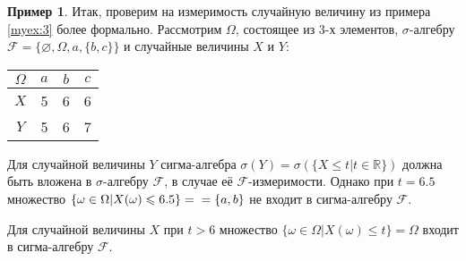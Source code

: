 \documentclass[pdftex, 12pt, a4paper]{article}
\def\R{\ensuremath{\mathbb{R}}} %
\def\F{\ensuremath{\mathcal{F}}} %
\def\s{\ensuremath{\sigma}}
\def \Om{\Omega}
\renewcommand{\le}{\leqslant}
\theoremstyle{definition} %
\newtheorem{myex}{Пример}
\numberwithin{problem}{section}
\numberwithin{blits}{section}
\begin{document}
\begin{myex}
Итак, проверим на измеримость случайную величину из примера \ref{myex:3} более формально. Рассмотрим $\Omega$, состоящее из 3-х элементов, $\sigma$-алгебру $\F=\{\varnothing,\Omega,a,\{b,c\}\}$ и случайные величины $X$ и $Y$:

\begin{table}[H]
\begin{center}
\begin{tabular}{|c|c|c|c|}
\hline
$\Om$ & $a$ & $b$ & $c$ \\
\hline
$X$ & 5 & 6 & 6 \\
\hline
$Y$ & 5 & 6 & 7 \\
\hline
\end{tabular}
\end{center}
\end{table}

Для случайной величины $Y$ сигма-алгебра $\s(Y) = \s(\{X \le t | t \in \R\})$ должна быть вложена в \s-алгебру $\F$, в случае её \F-измеримости. Однако при $t=6.5$ множество $\{\omega \in \Om | X(\omega) \le 6.5 \} = \\ = \{a,b\}$ не входит в сигма-алгебру \F. 

Для случайной величины $X$ при $t > 6$ множество $\{\omega \in \Om | X(\omega) \le t \} = \Om$ входит в сигма-алгебру \F. 


\end{myex}
\end{document}

